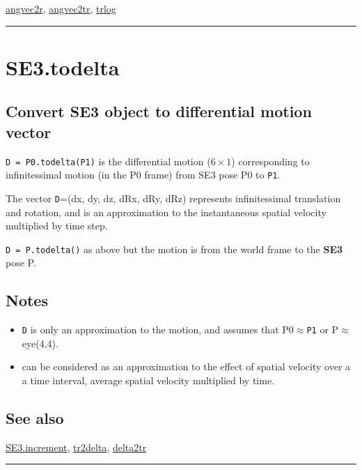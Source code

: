 \hyperlink{angvec2r}{\color{blue} angvec2r}, \hyperlink{angvec2tr}{\color{blue} angvec2tr}, \hyperlink{trlog}{\color{blue} trlog}

\vspace{1.5ex}\hrule

\hypertarget{SE3.todelta}{\section*{SE3.todelta}}
\subsection*{Convert SE3 object to differential motion vector}


\texttt{D = P0.todelta(P1)} is the differential motion ($6 \times 1$) corresponding to
infinitessimal motion (in the P0 frame) from SE3 pose P0 to \texttt{P1}.



The vector \texttt{D}=(dx, dy, dz, dRx, dRy, dRz) represents infinitessimal translation
and rotation, and is an approximation to the instantaneous spatial velocity
multiplied by time step.



\texttt{D = P.todelta()} as above but the motion is from the world frame to the \textbf{\color{red} SE3}
pose P.


\subsection*{Notes}
\begin{itemize}
  \item \texttt{D} is only an approximation to the motion, and assumes     that P0$\approx$\texttt{P1} or P$\approx$eye(4,4).
  \item can be considered as an approximation to the effect of spatial velocity over a     a time interval, average spatial velocity multiplied by time.
\end{itemize}

\subsection*{See also}


\hyperlink{SE3.increment}{\color{blue} SE3.increment}, \hyperlink{tr2delta}{\color{blue} tr2delta}, \hyperlink{delta2tr}{\color{blue} delta2tr}

\vspace{1.5ex}\hrule

